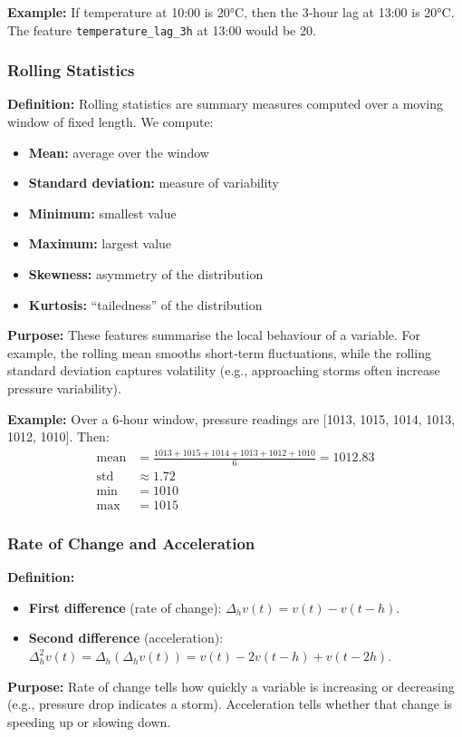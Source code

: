 \documentclass[12pt]{article}
\begin{document}
	\textbf{Example:} If temperature at 10:00 is 20°C, then the 3‑hour lag at 13:00 is 20°C. The feature \texttt{temperature\_lag\_3h} at 13:00 would be 20.
	
	\subsubsection{Rolling Statistics}
	\textbf{Definition:} Rolling statistics are summary measures computed over a moving window of fixed length. We compute:
	\begin{itemize}
		\item \textbf{Mean:} average over the window
		\item \textbf{Standard deviation:} measure of variability
		\item \textbf{Minimum:} smallest value
		\item \textbf{Maximum:} largest value
		\item \textbf{Skewness:} asymmetry of the distribution
		\item \textbf{Kurtosis:} “tailedness” of the distribution
	\end{itemize}
	\textbf{Purpose:} These features summarise the local behaviour of a variable. For example, the rolling mean smooths short‑term fluctuations, while the rolling standard deviation captures volatility (e.g., approaching storms often increase pressure variability).
	
	\textbf{Example:} Over a 6‑hour window, pressure readings are [1013, 1015, 1014, 1013, 1012, 1010]. Then:
	\begin{align*}
		\text{mean} &= \frac{1013+1015+1014+1013+1012+1010}{6} = 1012.83\\
		\text{std} &\approx 1.72\\
		\text{min} &= 1010\\
		\text{max} &= 1015
	\end{align*}
	
	\subsubsection{Rate of Change and Acceleration}
	\textbf{Definition:}
	\begin{itemize}
		\item \textbf{First difference} (rate of change): $\Delta_h v(t) = v(t) - v(t-h)$.
		\item \textbf{Second difference} (acceleration): $\Delta_h^2 v(t) = \Delta_h(\Delta_h v(t)) = v(t) - 2v(t-h) + v(t-2h)$.
	\end{itemize}
	\textbf{Purpose:} Rate of change tells how quickly a variable is increasing or decreasing (e.g., pressure drop indicates a storm). Acceleration tells whether that change is speeding up or slowing down.
	
\end{document}
